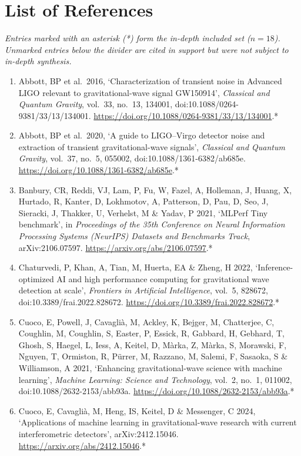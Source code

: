 \documentclass[11pt,a4paper]{article}
\begin{document}
\section*{List of References}

\noindent\textit{Entries marked with an asterisk (*) form the in-depth included set ($n = 18$). Unmarked entries below the divider are cited in support but were not subject to in-depth synthesis.}

\begin{enumerate}[label=\arabic*., leftmargin=2em]
\item Abbott, BP et al.\ 2016, `Characterization of transient noise in Advanced LIGO relevant to gravitational-wave signal GW150914', \textit{Classical and Quantum Gravity}, vol.\ 33, no.\ 13, 134001, doi:10.1088/0264-9381/33/13/134001. \url{https://doi.org/10.1088/0264-9381/33/13/134001}.*
\item Abbott, BP et al.\ 2020, `A guide to LIGO--Virgo detector noise and extraction of transient gravitational-wave signals', \textit{Classical and Quantum Gravity}, vol.\ 37, no.\ 5, 055002, doi:10.1088/1361-6382/ab685e. \url{https://doi.org/10.1088/1361-6382/ab685e}.*
\item Banbury, CR, Reddi, VJ, Lam, P, Fu, W, Fazel, A, Holleman, J, Huang, X, Hurtado, R, Kanter, D, Lokhmotov, A, Patterson, D, Pau, D, Seo, J, Sieracki, J, Thakker, U, Verhelst, M \& Yadav, P 2021, `MLPerf Tiny benchmark', in \textit{Proceedings of the 35th Conference on Neural Information Processing Systems (NeurIPS) Datasets and Benchmarks Track}, arXiv:2106.07597. \url{https://arxiv.org/abs/2106.07597}.*
\item Chaturvedi, P, Khan, A, Tian, M, Huerta, EA \& Zheng, H 2022, `Inference-optimized AI and high performance computing for gravitational wave detection at scale', \textit{Frontiers in Artificial Intelligence}, vol.\ 5, 828672, doi:10.3389/frai.2022.828672. \url{https://doi.org/10.3389/frai.2022.828672}.*
\item Cuoco, E, Powell, J, Cavagli\`{a}, M, Ackley, K, Bejger, M, Chatterjee, C, Coughlin, M, Coughlin, S, Easter, P, Essick, R, Gabbard, H, Gebhard, T, Ghosh, S, Haegel, L, Iess, A, Keitel, D, M\`{a}rka, Z, M\`{a}rka, S, Morawski, F, Nguyen, T, Ormiston, R, P\"{u}rrer, M, Razzano, M, Salemi, F, Sasaoka, S \& Williamson, A 2021, `Enhancing gravitational-wave science with machine learning', \textit{Machine Learning: Science and Technology}, vol.\ 2, no.\ 1, 011002, doi:10.1088/2632-2153/abb93a. \url{https://doi.org/10.1088/2632-2153/abb93a}.*
\item Cuoco, E, Cavagli\`{a}, M, Heng, IS, Keitel, D \& Messenger, C 2024, `Applications of machine learning in gravitational-wave research with current interferometric detectors', arXiv:2412.15046. \url{https://arxiv.org/abs/2412.15046}.*

\end{enumerate}
\end{document}
